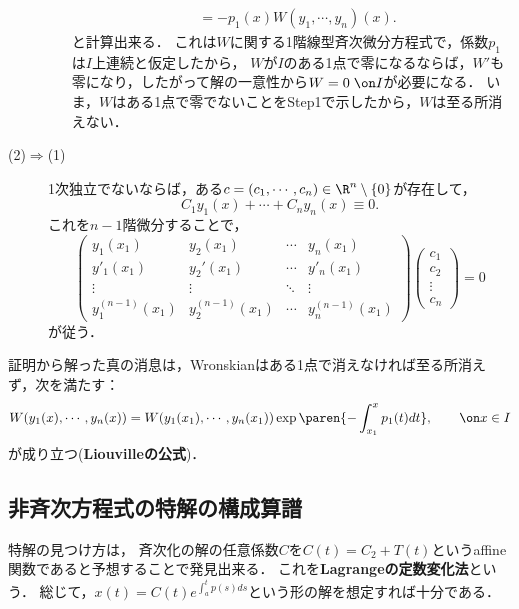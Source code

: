 \documentclass[uplatex,dvipdfmx]{jsreport}
\begin{document}
\begin{Proof}
\begin{description}
\begin{enumerate}[{Step}1]
\begin{align*}
                &=-p_1(x)W(y_1,\cdots,y_n)(x).
            \end{align*}
            と計算出来る．
            これは$W$に関する1階線型斉次微分方程式で，係数$p_1$は$I$上連続と仮定したから，
            $W$が$I$のある1点で零になるならば，$W'$も零になり，したがって解の一意性から$W=0\;\on I$が必要になる．
            いま，$W$はある1点で零でないことをStep1で示したから，$W$は至る所消えない．
        \end{enumerate}
        \item[(2)$\Rightarrow$(1)] 1次独立でないならば，ある$c=(c_1,\cdots,c_n)\in\R^n\setminus\{0\}$が存在して，
        \[C_1y_1(x)+\cdots+C_ny_n(x)\equiv0.\]
        これを$n-1$階微分することで，
        \[\begin{pmatrix}y_1(x_1)&y_2(x_1)&\cdots&y_n(x_1)\\y'_1(x_1)&y_2'(x_1)&\cdots&y'_n(x_1)\\\vdots&\vdots&\ddots&\vdots\\y_1^{(n-1)}(x_1)&y_2^{(n-1)}(x_1)&\cdots&y^{(n-1)}_n(x_1)\end{pmatrix}\begin{pmatrix}c_1\\c_2\\\vdots\\c_n\end{pmatrix}=0\]
        が従う．
    \end{description}
\end{Proof}
\begin{remarks}[Liouvilleの公式]
    証明から解った真の消息は，Wronskianはある1点で消えなければ至る所消えず，次を満たす：
    \[W(y_1(x),\cdots,y_n(x))=W(y_1(x_1),\cdots,y_n(x_1))\exp\paren{-\int^x_{x_1}p_1(t)dt},\qquad\on x\in I\]
    が成り立つ(\textbf{Liouvilleの公式})．
\end{remarks}

\subsection{非斉次方程式の特解の構成算譜}

\begin{tcolorbox}[colframe=ForestGreen, colback=ForestGreen!10!white,breakable,colbacktitle=ForestGreen!40!white,coltitle=black,fonttitle=\bfseries\sffamily,
title=定数変化法：離散Duhamelの原理]
    特解の見つけ方は，
    斉次化の解の任意係数$C$を$C(t)=C_2+T(t)$というaffine関数であると予想することで発見出来る．
    これを\textbf{Lagrangeの定数変化法}という．
    総じて，$x(t)=C(t)e^{\int^t_ap(s)ds}$という形の解を想定すれば十分である．
\end{tcolorbox}
\end{document}
